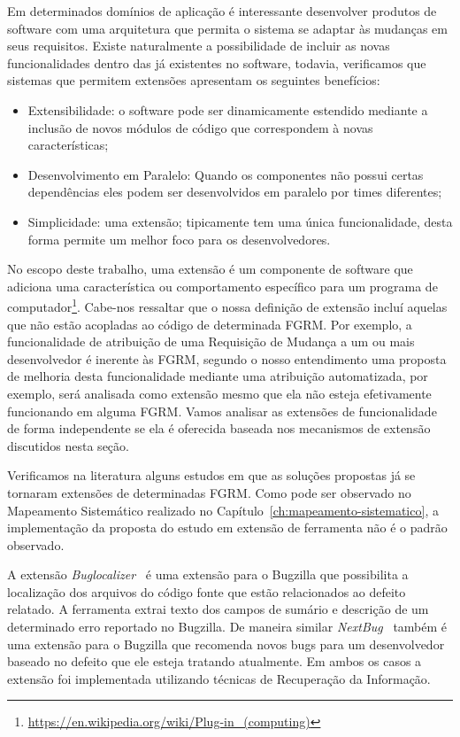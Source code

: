 Em determinados domínios de aplicação é interessante desenvolver produtos de
software com uma arquitetura que permita o sistema se adaptar às mudanças em
seus requisitos. Existe naturalmente a possibilidade de incluir as novas
funcionalidades dentro das já existentes no software, todavia, verificamos que
sistemas que permitem extensões apresentam os seguintes benefícios:

\begin{itemize}
	\item Extensibilidade: o software pode ser dinamicamente estendido mediante
		a inclusão de novos módulos de código que correspondem à novas
		características;
	\item Desenvolvimento em Paralelo: Quando os componentes não possui certas
		dependências eles podem ser desenvolvidos em paralelo por times
		diferentes;
	\item Simplicidade: uma  extensão; tipicamente tem uma única funcionalidade,
		desta forma permite um melhor foco para os desenvolvedores.
\end{itemize}

No escopo deste trabalho, uma extensão é um componente de software que adiciona
uma característica ou comportamento específico para um programa de
computador\footnote{\url{https://en.wikipedia.org/wiki/Plug-in_(computing)}}.
Cabe-nos ressaltar que o nossa definição de extensão incluí aquelas que não
estão acopladas ao código de determinada FGRM\@. Por exemplo, a funcionalidade
de atribuição de uma Requisição de Mudança a um ou mais desenvolvedor é inerente
às FGRM, segundo o nosso entendimento uma proposta de melhoria desta
funcionalidade mediante uma atribuição automatizada, por exemplo, será analisada
como extensão mesmo que ela não esteja efetivamente funcionando em alguma
FGRM\@. Vamos a\-na\-li\-sar as extensões de funcionalidade de forma
independente se ela é oferecida baseada nos mecanismos de extensão discutidos
nesta seção.

Verificamos na literatura alguns estudos em que as soluções propostas já se
tornaram extensões de determinadas FGRM. Como pode ser observado no Mapeamento
Sistemático realizado no Capítulo~\ref{ch:mapeamento-sistematico}, a
implementação da proposta do estudo em extensão de ferramenta não é o padrão
observado.

A extensão \textit{Buglocalizer}~\cite{Thung:2014:BIT:2635868.2661678} é uma
extensão para o Bugzilla que possibilita a localização dos arquivos do código
fonte que estão relacionados ao defeito relatado. A ferramenta extrai texto dos
campos de sumário e descrição de um determinado erro reportado no Bugzilla. De
maneira similar \textit{NextBug}~\cite{101186} também é uma extensão para o
Bugzilla que recomenda novos bugs para um desenvolvedor baseado no defeito que
ele esteja tratando atualmente. Em ambos os casos a extensão foi implementada
utilizando técnicas de Recuperação da Informação.

